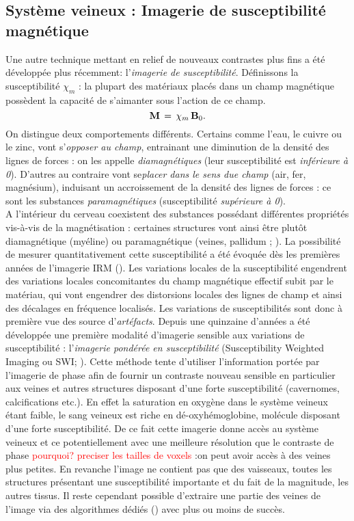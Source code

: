 \subsection{Système veineux : Imagerie de susceptibilité magnétique}
Une autre technique mettant en relief de nouveaux contrastes plus fins a été développée plus récemment: l’{\em imagerie de susceptibilité}. Définissons la susceptibilité $\chi_m$ : la plupart des matériaux placés dans un champ magnétique possèdent la capacité de s’aimanter sous l’action de ce  champ. 
\begin{equation}
\bold{M}\,=\,\chi_m\,\bold{B}_0.
\end{equation}
On distingue deux comportements différents. Certains comme l’eau, le cuivre ou le zinc, vont s’{\em opposer au champ}, entrainant une diminution de la densité des lignes de forces : on les appelle {\em diamagnétiques} (leur susceptibilité est {\em inférieure à 0}). D’autres au contraire vont se{\em placer dans le sens due champ} (air, fer, magnésium), induisant un accroissement de la densité des lignes de forces : ce sont les substances {\em paramagnétiques} (susceptibilité {\em supérieure à 0}).\\
A l’intérieur du cerveau coexistent des substances possédant différentes propriétés vis-à-vis de la magnétisation : certaines structures vont ainsi être plutôt diamagnétique (myéline) ou paramagnétique (veines, pallidum ; \cite{Wang_Liu_2014}). La possibilité de mesurer quantitativement cette susceptibilité a été évoquée dès les premières années de l’imagerie IRM (\cite{Young1987}). Les variations locales de la susceptibilité engendrent des variations locales concomitantes du champ magnétique effectif subit par le matériau, qui vont engendrer des distorsions locales des lignes de champ et ainsi des décalages en fréquence localisés. Les variations de susceptibilités sont donc à première vue des source d’{\em artéfacts}.  
Depuis une quinzaine d'années a été développée une première modalité d’imagerie sensible aux variations de susceptibilité : l’{\em imagerie pondérée en susceptibilité} (Susceptibility Weighted Imaging ou SWI; \cite{Reichenbach2001}). Cette méthode tente d’utiliser l’information portée par l’imagerie de phase afin de fournir un contraste nouveau sensible en particulier aux veines et autres structures disposant d’une forte susceptibilité (cavernomes, calcifications etc.). En effet la saturation en oxygène dans le système veineux étant faible, le sang veineux est riche en dé-oxyhémoglobine, molécule disposant d’une forte susceptibilité. De ce fait cette imagerie donne accès au système veineux et ce potentiellement avec une meilleure résolution que le contraste de phase\textcolor{red}{ pourquoi? preciser les tailles de voxels} :on peut avoir accès à des veines plus petites.  En revanche l’image ne contient pas que des vaisseaux, toutes les structures présentant une susceptibilité importante et du fait de la magnitude, les autres tissus. Il reste cependant possible d’extraire une partie des veines de l’image via des algorithmes dédiés (\cite{Manniesing2006}) avec plus ou moins de succès.\\
